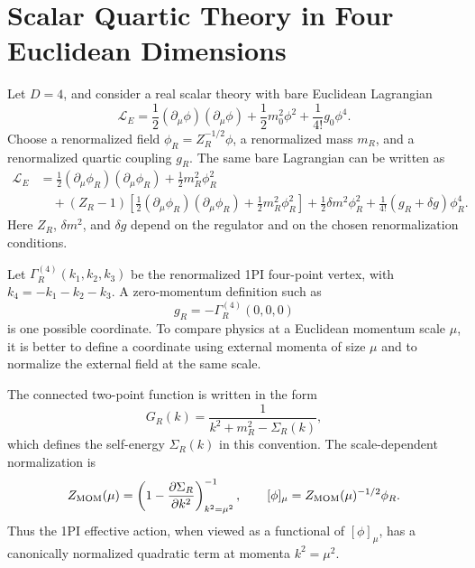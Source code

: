 \section{Scalar Quartic Theory in Four Euclidean Dimensions}

Let \(D=4\), and consider a real scalar theory with bare Euclidean Lagrangian
\[
  \mathcal L_E
  =
  \frac12(\partial_\mu\phi)(\partial_\mu\phi)
  +
  \frac12 m_0^2\phi^2
  +
  \frac1{4!}g_0\phi^4 .
\]
Choose a renormalized field \(\phi_R=Z_R^{-1/2}\phi\), a renormalized mass
\(m_R\), and a renormalized quartic coupling \(g_R\).  The same bare
Lagrangian can be written as
\[
\begin{aligned}
  \mathcal L_E
  &=
  \frac12(\partial_\mu\phi_R)(\partial_\mu\phi_R)
  +
  \frac12m_R^2\phi_R^2                                      \\
  &\quad
  +(Z_R-1)\left[
    \frac12(\partial_\mu\phi_R)(\partial_\mu\phi_R)
    +
    \frac12m_R^2\phi_R^2
  \right]
  +
  \frac12\delta m^2\phi_R^2
  +
  \frac1{4!}(g_R+\delta g)\phi_R^4 .
\end{aligned}
\]
Here \(Z_R\), \(\delta m^2\), and \(\delta g\) depend on the regulator and on
the chosen renormalization conditions.

Let \(\Gamma_R^{(4)}(k_1,k_2,k_3)\) be the renormalized 1PI four-point vertex,
with \(k_4=-k_1-k_2-k_3\).  A zero-momentum definition such as
\[
  g_R=-\Gamma_R^{(4)}(0,0,0)
\]
is one possible coordinate.  To compare physics at a Euclidean momentum scale
\(\mu\), it is better to define a coordinate using external momenta of size
\(\mu\) and to normalize the external field at the same scale.

The connected two-point function is written in the form
\[
  G_R(k)
  =
  \frac{1}{k^2+m_R^2-\Sigma_R(k)} ,
\]
which defines the self-energy \(\Sigma_R(k)\) in this convention.  The
scale-dependent normalization is
\[
  Z_{\rm MOM}(\mu)
  =
  \left(
    1-\frac{\partial\Sigma_R}{\partial k^2}
  \right)^{-1}_{k^2=\mu^2},
  \qquad
  [\phi]_\mu=Z_{\rm MOM}(\mu)^{-1/2}\phi_R .
\]
Thus the 1PI effective action, when viewed as a functional of
\([\phi]_\mu\), has a canonically normalized quadratic term at momenta
\(k^2=\mu^2\).

